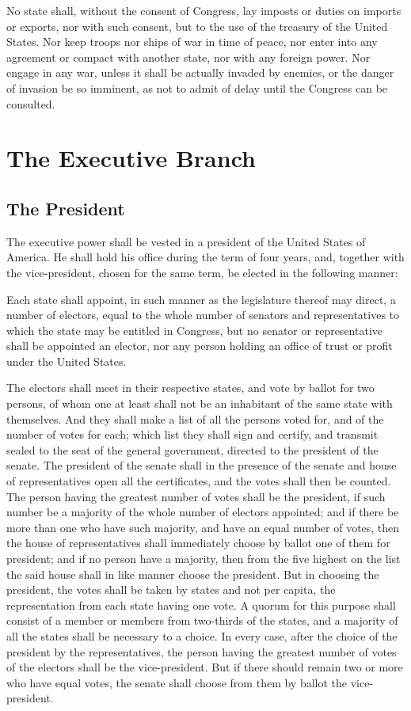 \documentclass{constitution}
\begin{document}
No state shall, without the consent of Congress, lay imposts or duties on imports or exports,
nor with such consent, but to the use of the treasury of the United States.
Nor keep troops nor ships of war in time of peace,
nor enter into any agreement or compact with another state, nor with any foreign power.
Nor engage in any war, unless it shall be actually invaded by enemies, or the danger of invasion be so imminent, as not to admit of delay until the Congress can be consulted.

\chapter{The Executive Branch}
\section{The President}
The executive power shall be vested in a president of the United States of America.
He shall hold his office during the term of four years,
and, together with the vice-president, chosen for the same term,
be elected in the following manner:

Each state shall appoint, in such manner as the legislature thereof may direct, a number of electors,
equal to the whole number of senators and representatives to which the state may be entitled in Congress,
but no senator or representative shall be appointed an elector,
nor any person holding an office of trust or profit under the United States.

The electors shall meet in their respective states, and vote by ballot for two persons,
of whom one at least shall not be an inhabitant of the same state with themselves.
And they shall make a list of all the persons voted for, and of the number of votes for each;
which list they shall sign and certify, and transmit sealed to the seat of the general government, directed to the president of the senate.
The president of the senate shall in the presence of the senate and house of representatives open all the certificates, and the votes shall then be counted.
The person having the greatest number of votes shall be the president, if such number be a majority of the whole number of electors appointed;
and if there be more than one who have such majority, and have an equal number of votes,
then the house of representatives shall immediately choose by ballot one of them for president;
and if no person have a majority, then from the five highest on the list the said house shall in like manner choose the president.
But in choosing the president, the votes shall be taken by states and not per capita,
the representation from each state having one vote.
A quorum for this purpose shall consist of a member or members from two-thirds of the states,
and a majority of all the states shall be necessary to a choice.
In every case, after the choice of the president by the representatives,
the person having the greatest number of votes of the electors shall be the vice-president.
But if there should remain two or more who have equal votes,
the senate shall choose from them by ballot the vice-president.
\end{document}
